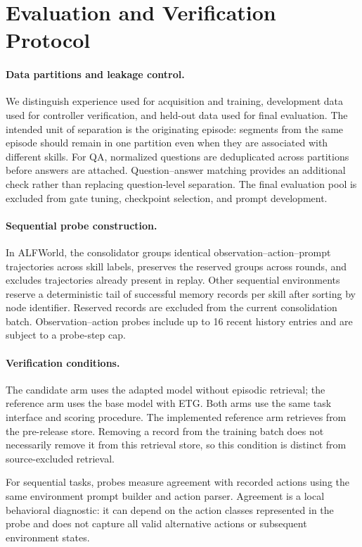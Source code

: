 \section{Evaluation and Verification Protocol}
\label{app:protocol}

\paragraph{Data partitions and leakage control.}
We distinguish experience used for acquisition and training,
development data used for controller verification, and
held-out data used for final evaluation. The intended unit
of separation is the originating episode: segments from the
same episode should remain in one partition even when they
are associated with different skills. For QA, normalized
questions are deduplicated across partitions before answers
are attached. Question--answer matching provides an additional
check rather than replacing question-level separation.
The final evaluation pool is excluded from gate tuning,
checkpoint selection, and prompt development.

\paragraph{Sequential probe construction.}
In ALFWorld, the consolidator groups identical
observation--action--prompt trajectories across skill labels,
preserves the reserved groups across rounds, and excludes
trajectories already present in replay. Other sequential
environments reserve a deterministic tail of successful
memory records per skill after sorting by node identifier.
Reserved records are excluded from the current consolidation
batch. Observation--action probes include up to 16 recent
history entries and are subject to a probe-step cap.

\paragraph{Verification conditions.}
The candidate arm uses the adapted model without episodic
retrieval; the reference arm uses the base model with ETG.
Both arms use the same task interface and scoring procedure.
The implemented reference arm retrieves from the pre-release
store. Removing a record from the training batch does not
necessarily remove it from this retrieval store, so this
condition is distinct from source-excluded retrieval.

For sequential tasks, probes measure agreement with recorded
actions using the same environment prompt builder and action
parser. Agreement is a local behavioral diagnostic: it can
depend on the action classes represented in the probe and
does not capture all valid alternative actions or subsequent
environment states.

